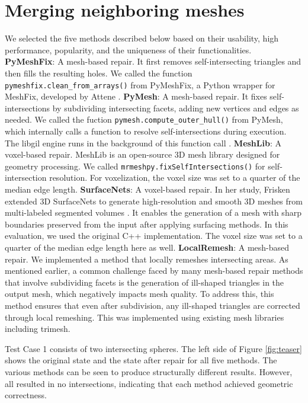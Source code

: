 \section{Merging neighboring meshes}
We selected the five methods described below based on their usability, high performance, popularity, and the uniqueness of their functionalities.
\textbf{PyMeshFix}: A mesh-based repair. It first removes self-intersecting triangles and then fills the resulting holes. We called the function \texttt{pymeshfix.clean\_from\_arrays()} from PyMeshFix, a Python wrapper for MeshFix, developed by Attene \cite{attene2010lightweight}.
\textbf{PyMesh}: A mesh-based repair. It fixes self-intersections by subdividing intersecting facets, adding new vertices and edges as needed. We called the fuction \texttt{pymesh.compute\_outer\allowbreak\_hull()} from PyMesh, which internally calls a function to resolve self-intersections during execution. The libgil engine runs in the background of this function call \cite{jacobson2018libigl}.  \textbf{MeshLib}: A voxel-based repair. MeshLib is an open-source 3D mesh library designed for geometry processing. We called \texttt{mrmeshpy.fixSelf\allowbreak Intersections()} for self-intersection resolution. For voxelization, the voxel size was set to a quarter of the median edge length. 
\textbf{SurfaceNets}: A voxel-based repair. In her study, Frisken extended 3D SurfaceNets to generate high-resolution and smooth 3D meshes from multi-labeled segmented volumes \cite{frisken2022surfacenets}. It enables the generation of a mesh with sharp boundaries preserved from the input after applying surfacing methods. In this evaluation, we used the original C++ implementation. The voxel size was set to a quarter of the median edge length here as well. 
\textbf{LocalRemesh}: A mesh-based repair. We implemented a method that locally remeshes intersecting areas. As mentioned earlier, a common challenge faced by many mesh-based repair methods that involve subdividing facets is the generation of ill-shaped triangles in the output mesh, which negatively impacts mesh quality. To address this, this method ensures that even after subdivision, any ill-shaped triangles are corrected through local remeshing. This was implemented using existing mesh libraries including trimesh. 


Test Case 1 consists of two intersecting spheres. The left side of Figure \ref{fig:teaser} shows the original state and the state after repair for all five methods. 
The various methods can be seen to produce structurally different results. However, all resulted in no intersections, indicating that each method achieved geometric correctness. 


